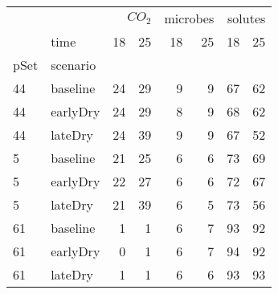 \begin{tabular}{llrrrrrr}
 &  & \multicolumn{2}{r}{$CO_2$} & \multicolumn{2}{r}{microbes} & \multicolumn{2}{r}{solutes} \\
 & time & 18 & 25 & 18 & 25 & 18 & 25 \\
pSet & scenario &  &  &  &  &  &  \\
44 & baseline & 24 & 29 & 9 & 9 & 67 & 62 \\
44 & earlyDry & 24 & 29 & 8 & 9 & 68 & 62 \\
44 & lateDry & 24 & 39 & 9 & 9 & 67 & 52 \\
5 & baseline & 21 & 25 & 6 & 6 & 73 & 69 \\
5 & earlyDry & 22 & 27 & 6 & 6 & 72 & 67 \\
5 & lateDry & 21 & 39 & 6 & 5 & 73 & 56 \\
61 & baseline & 1 & 1 & 6 & 7 & 93 & 92 \\
61 & earlyDry & 0 & 1 & 6 & 7 & 94 & 92 \\
61 & lateDry & 1 & 1 & 6 & 6 & 93 & 93 \\
\end{tabular}
